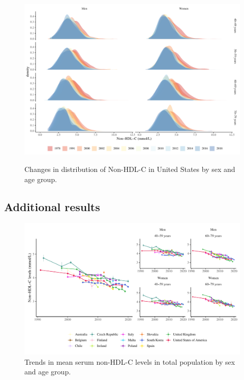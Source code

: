 \documentclass[12pt]{article}
\begin{document}
\begin{appendix}
\begin{refsection}
\begin{landscape}
        \begin{figure}[H]
            \centering
            \caption{Changes in distribution of Non-HDL-C in United States by sex and age group.}
            \includegraphics[width=\linewidth]{../3_figures/figS4_densities.pdf}
            \label{fig:densities}
        \end{figure}

        \subsection{Additional results}

        \begin{figure}[H]
            \centering
            \includegraphics[width=\linewidth]{../3_figures/nonhdl.pdf}
            \caption{Trends in mean serum non-HDL-C levels in total population by sex and age group.}
            \label{fig:mean_chol}
        \end{figure}


\end{landscape}
\end{refsection}
\end{appendix}
\end{document}
